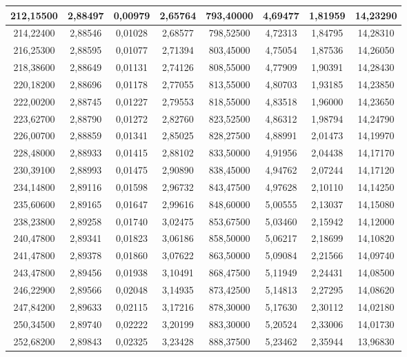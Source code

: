 \documentclass[a4paper,12pt]{article}
\numberwithin{equation}{section}
\begin{document}
\begin{appendices}
\begin{longtable}[c]{|c|c|c|c|c|c|c|c|}
212,15500	&	2,88497	&	0,00979	&	2,65764	&	793,40000	&	4,69477	&	1,81959	&	14,23290	\\\hline
214,22400	&	2,88546	&	0,01028	&	2,68577	&	798,52500	&	4,72313	&	1,84795	&	14,28310	\\\hline
216,25300	&	2,88595	&	0,01077	&	2,71394	&	803,45000	&	4,75054	&	1,87536	&	14,26050	\\\hline
218,38600	&	2,88649	&	0,01131	&	2,74126	&	808,55000	&	4,77909	&	1,90391	&	14,28430	\\\hline
220,18200	&	2,88696	&	0,01178	&	2,77055	&	813,55000	&	4,80703	&	1,93185	&	14,23850	\\\hline
222,00200	&	2,88745	&	0,01227	&	2,79553	&	818,55000	&	4,83518	&	1,96000	&	14,23650	\\\hline
223,62700	&	2,88790	&	0,01272	&	2,82760	&	823,52500	&	4,86312	&	1,98794	&	14,24790	\\\hline
226,00700	&	2,88859	&	0,01341	&	2,85025	&	828,27500	&	4,88991	&	2,01473	&	14,19970	\\\hline
228,48000	&	2,88933	&	0,01415	&	2,88102	&	833,50000	&	4,91956	&	2,04438	&	14,17170	\\\hline
230,39100	&	2,88993	&	0,01475	&	2,90890	&	838,45000	&	4,94762	&	2,07244	&	14,17120	\\\hline
234,14800	&	2,89116	&	0,01598	&	2,96732	&	843,47500	&	4,97628	&	2,10110	&	14,14250	\\\hline
235,60600	&	2,89165	&	0,01647	&	2,99616	&	848,60000	&	5,00555	&	2,13037	&	14,15080	\\\hline
238,23800	&	2,89258	&	0,01740	&	3,02475	&	853,67500	&	5,03460	&	2,15942	&	14,12000	\\\hline
240,47800	&	2,89341	&	0,01823	&	3,06186	&	858,50000	&	5,06217	&	2,18699	&	14,10820	\\\hline
241,47800	&	2,89378	&	0,01860	&	3,07622	&	863,50000	&	5,09084	&	2,21566	&	14,09740	\\\hline
243,47800	&	2,89456	&	0,01938	&	3,10491	&	868,47500	&	5,11949	&	2,24431	&	14,08500	\\\hline
246,22900	&	2,89566	&	0,02048	&	3,14935	&	873,42500	&	5,14813	&	2,27295	&	14,08620	\\\hline
247,84200	&	2,89633	&	0,02115	&	3,17216	&	878,30000	&	5,17630	&	2,30112	&	14,02180	\\\hline
250,34500	&	2,89740	&	0,02222	&	3,20199	&	883,30000	&	5,20524	&	2,33006	&	14,01730	\\\hline
252,68200	&	2,89843	&	0,02325	&	3,23428	&	888,37500	&	5,23462	&	2,35944	&	13,96830	\\\hline

\end{longtable}
\end{appendices}
\end{document}

